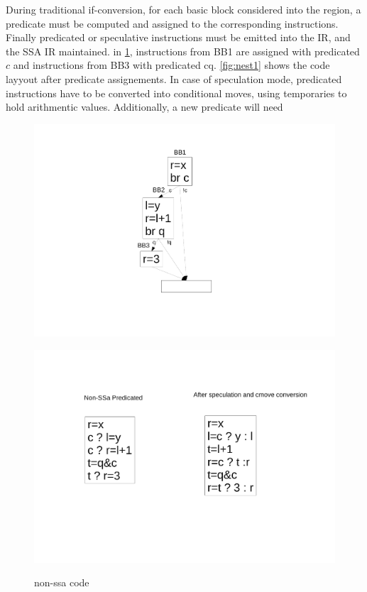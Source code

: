 During traditional if-conversion, for each basic block considered into the region, a predicate must be computed and assigned to the corresponding instructions. Finally predicated or speculative instructions must be emitted into the IR, and the SSA IR maintained. in \ref{fig:nest0}, instructions from BB1 are assigned with predicated $c$ and instructions from BB3 with predicated cq. \ref{fig:nest1} shows the code layyout after predicate assignements. In case of speculation mode, predicated instructions have to be converted into conditional moves, using temporaries to hold arithmentic values. Additionally, a new predicate will need 

\begin{figure}
\footnotesize
\begin{minipage}[b]{4cm}
\includegraphics[scale=0.2]{nested_0.pdf}
\label{fig:nest0}
\end{minipage}
\begin{minipage}[b]{4cm}
\includegraphics[scale=0.2]{nested_01.pdf}
\label{fig:nest0}
\end{minipage}
\caption{non-ssa code}
\end{figure}

